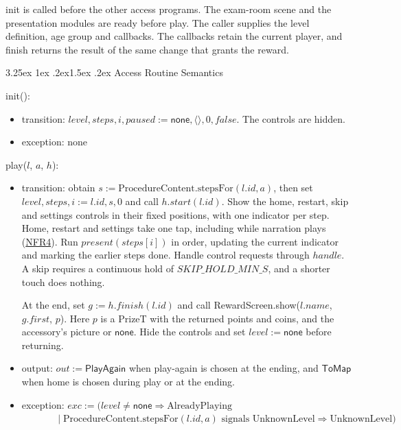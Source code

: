 \documentclass[10pt, titlepage]{article}
\makeatletter
\newcommand{\srsurl}{https://team-hindsight.github.io/ophthamology-game/SRS/SRS.pdf}
\newcommand{\srsitemref}[2]{\href{\srsurl\#nameddest=#1}{#2}}
\renewcommand\paragraph{\@startsection{paragraph}{4}{\z@}%
  {3.25ex \@plus 1ex \@minus .2ex}{1.5ex \@plus .2ex}%
  {\normalfont\normalsize\bfseries}}
\newcommand{\T}[1]{\mathit{#1}}          %
\newcommand{\V}[1]{\mathsf{#1}}          %
\newcommand{\out}{\mathit{out}}
\newcommand{\exc}{\mathit{exc}}
\newcommand{\false}{\mathit{false}}
\makeatother
\begin{document}
init is called before the other access programs. The exam-room scene and
the presentation modules are ready before play. The caller supplies the
level definition, age group and callbacks. The callbacks retain the
current player, and finish returns the result of the same change that
grants the reward.

\paragraph{Access Routine Semantics}

\begin{samepage}
\noindent init():
\begin{itemize}
\item transition: $\T{level}, \T{steps}, i, \T{paused} := \V{none},
  \langle\rangle, 0, \false$. The controls are hidden.
\item exception: none
\end{itemize}
\end{samepage}
\par\pagebreak[0]

\begin{samepage}
\noindent play($l$, $a$, $h$):
\begin{itemize}
\item transition: obtain $s := \text{ProcedureContent.stepsFor}(l.\T{id},a)$,
  then set $\T{level}, \T{steps}, i := l.\T{id}, s, 0$ and call
  $h.\T{start}(l.\T{id})$. Show the home, restart, skip and settings
  controls in their fixed positions, with one indicator per step.
  Home, restart and settings take one tap, including while narration
  plays (\srsitemref{NFR_Exit}{NFR4}).
  Run $\T{present}(\T{steps}[i])$ in order, updating the current
  indicator and marking the earlier steps done. Handle control requests through
  $\T{handle}$. A skip requires a continuous hold of
  $\T{SKIP\_HOLD\_MIN\_S}$, and a shorter touch does nothing.

  At the end, set $g := h.\T{finish}(l.\T{id})$ and call
  RewardScreen.show($l.\T{name}$, $g.\T{first}$, $p$). Here $p$ is a
  PrizeT with the returned points and coins, and the accessory's picture
  or $\V{none}$. Hide the controls and set $\T{level} := \V{none}$
  before returning.
\item output: $\out := \V{PlayAgain}$ when play-again is chosen at
  the ending, and $\V{ToMap}$ when home is chosen during play or at
  the ending.
\item exception: $\exc := (\T{level} \neq \V{none} \Rightarrow
  \text{AlreadyPlaying}$\\
  $\phantom{\exc := (}\mid \text{ProcedureContent.stepsFor}(l.\T{id}, a)
  \text{ signals UnknownLevel} \Rightarrow \text{UnknownLevel})$
\end{itemize}
\end{samepage}
\par\pagebreak[0]
\end{document}
